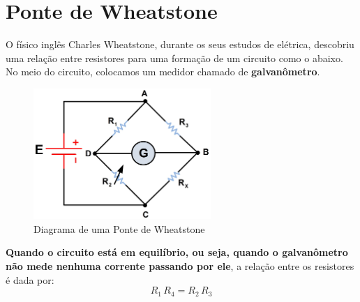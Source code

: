 \documentclass[12pt]{extarticle}
\newcommand{\<}{\langle}
\renewcommand{\>}{\rangle}
\theoremstyle{definition}
\begin{document}
\section{Ponte de Wheatstone}
O físico inglês Charles Wheatstone, durante os seus estudos de elétrica, descobriu uma relação entre resistores para uma formação de um circuito como o abaixo. No meio do circuito, colocamos um medidor chamado de \textbf{galvanômetro}.
\begin{figure}[H]
    \centering
    \includegraphics[width=0.6\textwidth]{wheat.jpg}
    \caption{Diagrama de uma Ponte de Wheatstone}
    \label{fig:wheatstone}
\end{figure}

\textbf{Quando o circuito está em equilíbrio, ou seja, quando o galvanômetro não mede nenhuma corrente passando por ele}, a relação entre os resistores é dada por:
\begin{equation}
    R_1\,R_4 = R_2\,R_3
\end{equation}
\end{document}
